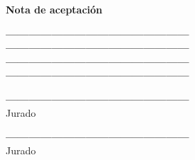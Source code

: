 \newpage
\thispagestyle{empty}

\vspace{0.3cm}
{\huge \textbf{Nota de aceptación}}\\
\vspace{1.5cm}

\begin{flushright}
	\textbf{------------------------------------------------} \\ \vspace{1cm}
	\textbf{------------------------------------------------} \\ \vspace{1cm}
	\textbf{------------------------------------------------} \\ \vspace{1cm}
	\textbf{------------------------------------------------} \\ \vspace{1cm}
	\vspace{3cm}

	\textbf{------------------------------------------------} \\
	Jurado\\ \vspace{3cm}

	\textbf{------------------------------------------------} \\
	Jurado\\ \vspace{4cm}
\end{flushright}

